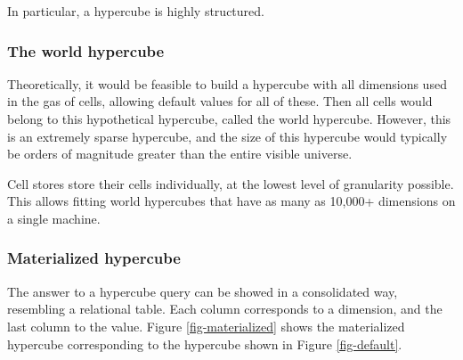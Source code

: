 \documentclass{acm_proc_article-sp}
\begin{document}
In particular, a hypercube is highly structured.

\subsubsection{The world hypercube}
Theoretically, it would be feasible to build a hypercube with all dimensions used in the gas of cells, allowing default values for all of these. Then all cells would belong to this hypothetical hypercube, called the world hypercube. However, this is an extremely sparse hypercube, and the size of this hypercube would typically be orders of magnitude greater than the entire visible universe.

Cell stores store their cells individually, at the lowest level of granularity possible. This allows fitting world hypercubes that have as many as 10,000+ dimensions on a single machine.

\subsubsection{Materialized hypercube}

The answer to a hypercube query can be showed in a consolidated way, resembling a relational table. Each column corresponds to a dimension, and the last column to the value. Figure \ref{fig-materialized} shows the materialized hypercube corresponding to the hypercube shown in Figure \ref{fig-default}.
\end{document}
